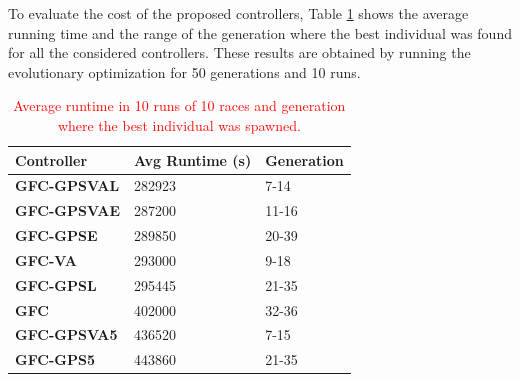 \documentclass[10pt,journal,compsoc]{IEEEtran}
\begin{document}

To evaluate the cost of the proposed controllers, Table \ref{tab:time} shows the average running time and the range of the generation where the best individual was found for all the considered controllers. These results are obtained by running the evolutionary optimization for 50 generations and 10 runs.  

\begin{table}[!ht]
	\centering
	{\scriptsize
          \caption{\textcolor{red}{Average runtime in 10 runs of 10 races 
            and
                  generation where the best individual was spawned.}}
		\label{tab:time}
		\begin{tabular}{|p{2.85cm}|p{2.20cm}|p{1.65cm}|}
			\hline  
			Controller& \textbf{Avg Runtime (s)}&\textbf{Generation}\\
\hline
\hline 	 
 \textbf{{\sf GFC-GPSVAL}} \cite{DBLP:conf/cig/SalemMG19}& \cellcolor{red!25}282923
&\cellcolor{red!25}7-14\\	
\textbf{{\sf GFC-GPSVAE}}& \cellcolor{red!25}287200
&\cellcolor{red!25}11-16\\
 \textbf{{\sf GFC-GPSE}}&\cellcolor{red!25}	289850
&\cellcolor{red!25}20-39\\
\textbf{{\sf GFC-VA}} \cite{DBLP:conf/cig/SalemMG19}&\cellcolor{red!25}293000
&\cellcolor{red!25}9-18\\
 \textbf{{\sf GFC-GPSL}} \cite{DBLP:conf/cig/SalemMG19}& \cellcolor{red!25}295445
&\cellcolor{red!25}21-35\\
\textbf{\textbf{{\sf GFC}}} \cite{salem_cig2018}&\cellcolor{red!25}402000
                   &\cellcolor{red!25}32-36\\
\textbf{{\sf GFC-GPSVA5}} \cite{DBLP:conf/cig/SalemMG19}&\cellcolor{red!25}	436520
&\cellcolor{red!25}7-15\\	
	
 \textbf{{\sf GFC-GPS5}} \cite{DBLP:conf/cig/SalemMG19}&\cellcolor{red!25}443860
				&\cellcolor{red!25}21-35\\	
					
			\hline 
		
		\end{tabular}
		
	}
\end{table} 
\end{document}
